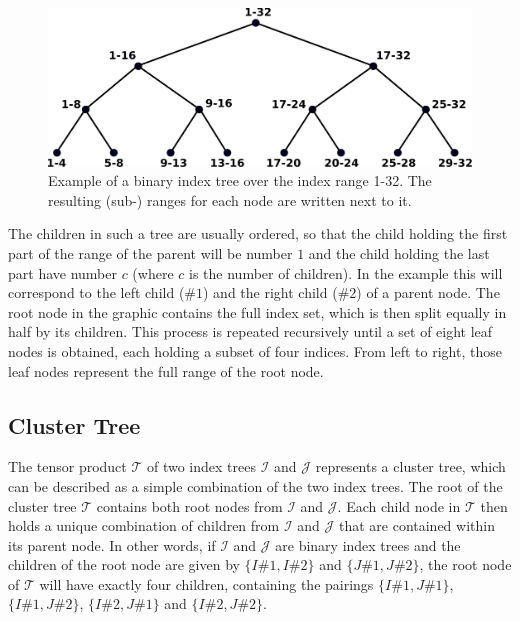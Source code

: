 \begin{figure}[h]
    \centering
    \includegraphics[width=0.7\linewidth]{chapters/4_hierarchical_matrices/figures/index_tree.pdf}
    \caption[Index Tree]{Example of a binary index tree over the index range 1-32. The resulting (sub-) ranges for each node are written next to it.}
    \label{fig:index_tree}
\end{figure}

The children in such a tree are usually ordered, so that the child holding the first part of the range of the parent will be number $1$ and the child holding the last part have number $c$ (where $c$ is the number of children). In the example this will correspond to the left child ($\#1$) and the right child ($\#2$) of a parent node. The root node in the graphic contains the full index set, which is then split equally in half by its children. This process is repeated recursively until a set of eight leaf nodes is obtained, each holding a subset of four indices. From left to right, those leaf nodes represent the full range of the root node.



\subsection{Cluster Tree}
\label{sec:cluster_tree}

The tensor product $\mathcal{T}$ of two index trees $\mathcal{I}$ and $\mathcal{J}$ represents a cluster tree, which can be described as a simple combination of the two index trees. The root of the cluster tree $\mathcal{T}$ contains both root nodes from $\mathcal{I}$ and $\mathcal{J}$. Each child node in $\mathcal{T}$ then holds a unique combination of children from $\mathcal{I}$ and $\mathcal{J}$ that are contained within its parent node. In other words, if $\mathcal{I}$ and $\mathcal{J}$ are binary index trees and the children of the root node are given by $\{I\#1, I\#2\}$ and $\{J\#1, J\#2\}$, the root node of $\mathcal{T}$ will have exactly four children, containing the pairings $\{I\#1, J\#1\}$, $\{I\#1, J\#2\}$, $\{I\#2, J\#1\}$ and $\{I\#2, J\#2\}$.

